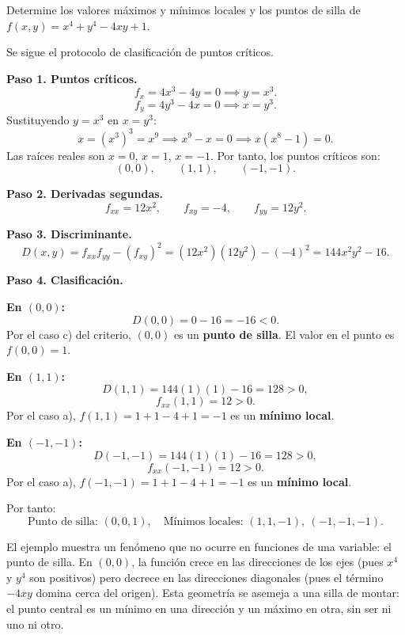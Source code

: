 \begin{example}
Determine los valores máximos y mínimos locales y los puntos de silla de
$f(x,y) = x^4 + y^4 - 4xy + 1$.
\begin{myproof}
Se sigue el protocolo de clasificación de puntos críticos.

\textbf{Paso 1. Puntos críticos.}
\[
f_x = 4x^3 - 4y = 0 \implies y = x^3.
\]
\[
f_y = 4y^3 - 4x = 0 \implies x = y^3.
\]
Sustituyendo $y=x^3$ en $x=y^3$:
\[
x = (x^3)^3 = x^9 \implies x^9 - x = 0 \implies x(x^8 - 1)=0.
\]
Las raíces reales son $x=0$, $x=1$, $x=-1$. Por tanto, los puntos
críticos son:
\[
(0,0),\qquad (1,1),\qquad (-1,-1).
\]

\textbf{Paso 2. Derivadas segundas.}
\[
f_{xx} = 12x^2,\qquad f_{xy} = -4,\qquad f_{yy} = 12y^2.
\]

\textbf{Paso 3. Discriminante.}
\[
D(x,y) = f_{xx} f_{yy} - (f_{xy})^2
= (12x^2)(12y^2) - (-4)^2
= 144x^2 y^2 - 16.
\]

\textbf{Paso 4. Clasificación.}

\textbf{En $(0,0)$:}
\[
D(0,0) = 0 - 16 = -16 < 0.
\]
Por el caso c) del criterio, $(0,0)$ es un \textbf{punto de silla}.
El valor en el punto es $f(0,0)=1$.

\textbf{En $(1,1)$:}
\[
D(1,1) = 144(1)(1) - 16 = 128 > 0,
\]
\[
f_{xx}(1,1) = 12 > 0.
\]
Por el caso a), $f(1,1) = 1 + 1 - 4 + 1 = -1$ es un
\textbf{mínimo local}.

\textbf{En $(-1,-1)$:}
\[
D(-1,-1) = 144(1)(1) - 16 = 128 > 0,
\]
\[
f_{xx}(-1,-1) = 12 > 0.
\]
Por el caso a), $f(-1,-1) = 1 + 1 - 4 + 1 = -1$ es un
\textbf{mínimo local}.

Por tanto:
\[
\boxed{
\text{Punto de silla: } (0,0,1),\quad
\text{Mínimos locales: } (1,1,-1),\ (-1,-1,-1)
}.
\]
\end{myproof}
\end{example}

\begin{rem}
El ejemplo muestra un fenómeno que no ocurre en funciones de una
variable: el punto de silla. En $(0,0)$, la función crece en las
direcciones de los ejes (pues $x^4$ y $y^4$ son positivos) pero decrece
en las direcciones diagonales (pues el término $-4xy$ domina cerca del
origen). Esta geometría se asemeja a una silla de montar: el punto
central es un mínimo en una dirección y un máximo en otra, sin ser ni uno
ni otro.
\end{rem}

